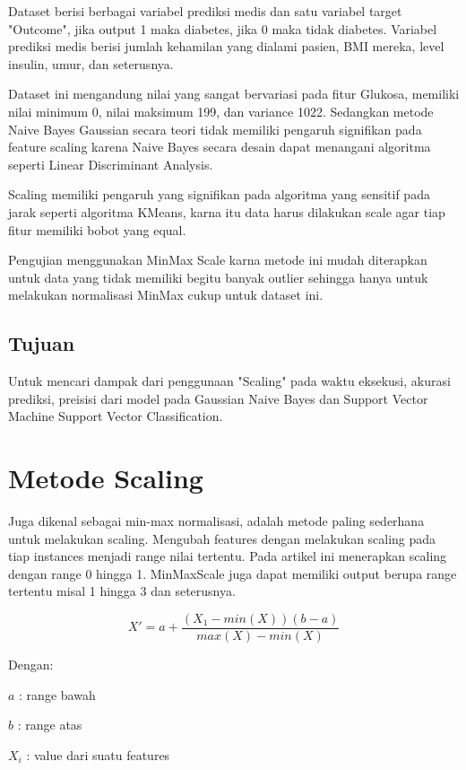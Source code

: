 \documentclass[conference]{IEEEtran}
\begin{document}
Dataset berisi berbagai variabel prediksi medis dan satu variabel target "Outcome", jika output 1 maka diabetes, jika 0 maka tidak diabetes. Variabel prediksi medis berisi jumlah kehamilan yang dialami pasien, BMI mereka, level insulin, umur, dan seterusnya.

Dataset ini mengandung nilai yang sangat bervariasi pada fitur Glukosa, memiliki nilai minimum 0, nilai maksimum 199, dan variance 1022. Sedangkan metode Naive Bayes Gaussian secara teori tidak memiliki pengaruh signifikan pada feature scaling karena Naive Bayes secara desain dapat menangani algoritma seperti Linear Discriminant Analysis. 

Scaling memiliki pengaruh yang signifikan pada algoritma yang sensitif pada jarak seperti algoritma KMeans, karna itu data harus dilakukan scale agar tiap fitur memiliki bobot yang equal.

Pengujian menggunakan MinMax Scale karna metode ini mudah diterapkan untuk data yang tidak memiliki begitu banyak outlier sehingga hanya untuk melakukan normalisasi MinMax cukup untuk dataset ini. 

\subsection{Tujuan}
Untuk mencari dampak dari penggunaan "Scaling" pada waktu eksekusi, akurasi prediksi, preisisi dari model pada Gaussian Naive Bayes dan Support Vector Machine Support Vector Classification.

\section{Metode Scaling}
Juga dikenal sebagai min-max normalisasi, adalah metode paling sederhana untuk melakukan scaling. Mengubah features dengan melakukan scaling pada tiap instances menjadi range nilai tertentu. Pada artikel ini menerapkan scaling dengan range 0 hingga 1. MinMaxScale juga dapat memiliki output berupa range tertentu misal 1 hingga 3 dan seterusnya. 

\begin{equation}
\label{minmax_scaler_formula}
X' = a + 
\frac{(X_1-min(X))(b-a)}{max(X)-min(X)}
\end{equation}

Dengan:

$a$ : range bawah

$b$ : range atas

$X_i$ : value dari suatu features
\end{document}
